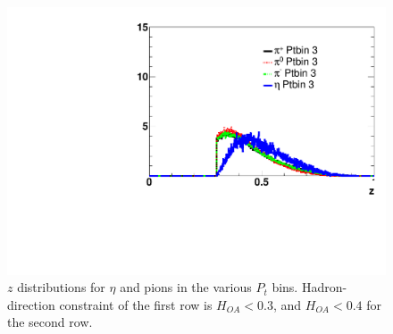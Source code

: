 \begin{figure}[H]
\includegraphics[width=.24\textwidth,natwidth=250,natheight=100]{figure_fiducial/had0.4_z0.3/Z_distri_for_ptbin_3_norm_had04.pdf}\hfill
    \caption[$z$ distributions for \(\eta\) and pions in the various $P_t$ bins]{$z$ distributions for \(\eta\) and pions in the various $P_t$ bins. Hadron-direction constraint of the first row is $H_{OA}<0.3$, and  $H_{OA}<0.4$ for the second row.}
\end{figure}